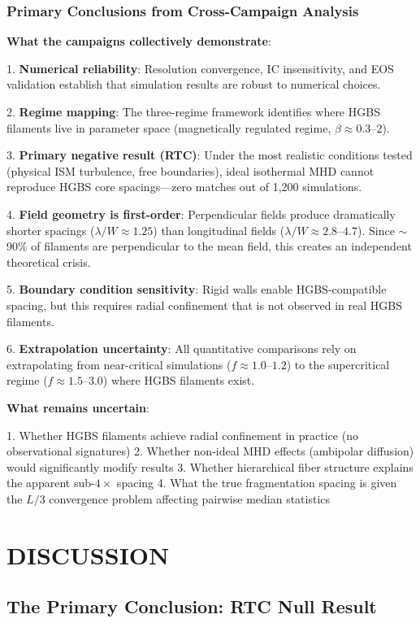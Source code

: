 \documentclass[twocolumn]{mnras}
\begin{document}
\subsubsection{Primary Conclusions from Cross-Campaign Analysis}

\textbf{What the campaigns collectively demonstrate}:

1. \textbf{Numerical reliability}: Resolution convergence, IC insensitivity, and EOS validation establish that simulation results are robust to numerical choices.

2. \textbf{Regime mapping}: The three-regime framework identifies where HGBS filaments live in parameter space (magnetically regulated regime, $\beta \approx 0.3$--$2$).

3. \textbf{Primary negative result (RTC)}: Under the most realistic conditions tested (physical ISM turbulence, free boundaries), ideal isothermal MHD cannot reproduce HGBS core spacings—zero matches out of 1,200 simulations.

4. \textbf{Field geometry is first-order}: Perpendicular fields produce dramatically shorter spacings ($\lambda/W \approx 1.25$) than longitudinal fields ($\lambda/W \approx 2.8$--$4.7$). Since $\sim$90\% of filaments are perpendicular to the mean field, this creates an independent theoretical crisis.

5. \textbf{Boundary condition sensitivity}: Rigid walls enable HGBS-compatible spacing, but this requires radial confinement that is not observed in real HGBS filaments.

6. \textbf{Extrapolation uncertainty}: All quantitative comparisons rely on extrapolating from near-critical simulations ($f \approx 1.0$--$1.2$) to the supercritical regime ($f \approx 1.5$--$3.0$) where HGBS filaments exist.

\textbf{What remains uncertain}:

1. Whether HGBS filaments achieve radial confinement in practice (no observational signatures)
2. Whether non-ideal MHD effects (ambipolar diffusion) would significantly modify results
3. Whether hierarchical fiber structure explains the apparent sub-$4\times$ spacing
4. What the true fragmentation spacing is given the $L/3$ convergence problem affecting pairwise median statistics
\section{DISCUSSION}

\subsection{The Primary Conclusion: RTC Null Result}
\end{document}
